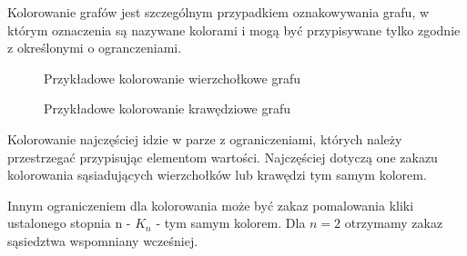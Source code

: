     \begin{definition}
      Kolorowanie grafów jest szczególnym przypadkiem oznakowywania grafu,
       w którym oznaczenia są nazywane kolorami i mogą być przypisywane tylko zgodnie z określonymi o
       ogranczeniami. 
    \end{definition}

    \begin{figure}[H]
      \centering
        \caption{Przykładowe kolorowanie wierzchołkowe grafu}
     \end{figure}

    \begin{figure}[H]
      \centering
        \caption{Przykładowe kolorowanie krawędziowe grafu}
     \end{figure}

     Kolorowanie najczęściej idzie w parze z ograniczeniami, których należy przestrzegać przypisując elementom wartości.
     Najczęściej dotyczą one zakazu kolorowania sąsiadujących wierzchołków lub krawędzi tym samym kolorem. 

     Innym ograniczeniem dla kolorowania może być zakaz pomalowania kliki ustalonego stopnia n - $K_n$ - tym samym kolorem.
     Dla $n=2$ otrzymamy zakaz sąsiedztwa wspomniany wcześniej.  